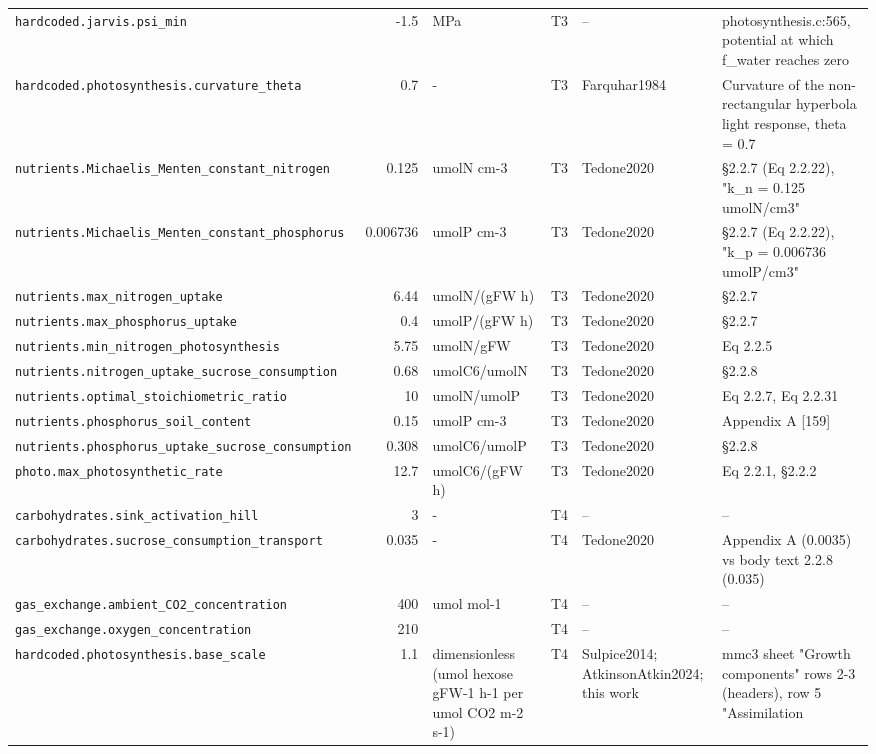 \begin{table}[!htbp]
\begin{tabular}{@{}p{52mm}rp{20mm}cp{20mm}p{38mm}@{}}
\texttt{hardcoded.jarvis.psi\_min} & -1.5 & MPa & T3 & -- & photosynthesis.c:565, potential at which f\_water reaches zero \\
\texttt{hardcoded.photosynthesis.curvature\_theta} & 0.7 & - & T3 & Farquhar1984 & Curvature of the non-rectangular hyperbola light response, theta = 0.7 \\
\texttt{nutrients.Michaelis\_Menten\_constant\_nitrogen} & 0.125 & umolN cm-3 & T3 & Tedone2020 & §2.2.7 (Eq 2.2.22), "k\_n = 0.125 umolN/cm3" \\
\texttt{nutrients.Michaelis\_Menten\_constant\_phosphorus} & 0.006736 & umolP cm-3 & T3 & Tedone2020 & §2.2.7 (Eq 2.2.22), "k\_p = 0.006736 umolP/cm3" \\
\texttt{nutrients.max\_nitrogen\_uptake} & 6.44 & umolN/(gFW h) & T3 & Tedone2020 & §2.2.7 \\
\texttt{nutrients.max\_phosphorus\_uptake} & 0.4 & umolP/(gFW h) & T3 & Tedone2020 & §2.2.7 \\
\texttt{nutrients.min\_nitrogen\_photosynthesis} & 5.75 & umolN/gFW & T3 & Tedone2020 & Eq 2.2.5 \\
\texttt{nutrients.nitrogen\_uptake\_sucrose\_consumption} & 0.68 & umolC6/umolN & T3 & Tedone2020 & §2.2.8 \\
\texttt{nutrients.optimal\_stoichiometric\_ratio} & 10 & umolN/umolP & T3 & Tedone2020 & Eq 2.2.7, Eq 2.2.31 \\
\texttt{nutrients.phosphorus\_soil\_content} & 0.15 & umolP cm-3 & T3 & Tedone2020 & Appendix A [159] \\
\texttt{nutrients.phosphorus\_uptake\_sucrose\_consumption} & 0.308 & umolC6/umolP & T3 & Tedone2020 & §2.2.8 \\
\texttt{photo.max\_photosynthetic\_rate} & 12.7 & umolC6/(gFW h) & T3 & Tedone2020 & Eq 2.2.1, §2.2.2 \\
\texttt{carbohydrates.sink\_activation\_hill} & 3 & - & T4 & -- & -- \\
\texttt{carbohydrates.sucrose\_consumption\_transport} & 0.035 & - & T4 & Tedone2020 & Appendix A (0.0035) vs body text 2.2.8 (0.035) \\
\texttt{gas\_exchange.ambient\_CO2\_concentration} & 400 & umol mol-1 & T4 & -- & -- \\
\texttt{gas\_exchange.oxygen\_concentration} & 210 &  & T4 & -- & -- \\
\texttt{hardcoded.photosynthesis.base\_scale} & 1.1 & dimensionless (umol hexose gFW-1 h-1 per umol CO2 m-2 s-1) & T4 & Sulpice2014; AtkinsonAtkin2024; this work & mmc3 sheet "Growth components" rows 2-3 (headers), row 5 "Assimilation \\

\end{tabular}
\end{table}
